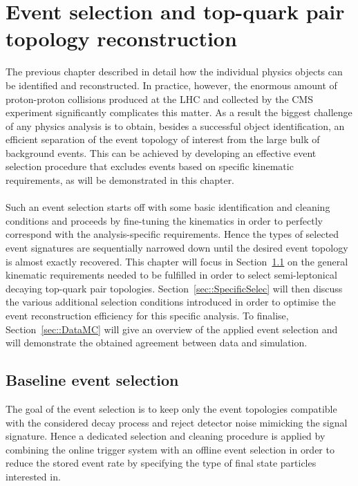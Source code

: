 \chapter{Event selection and top-quark pair topology reconstruction} \label{ch::EvtSel}

The previous chapter described in detail how the individual physics objects can be identified and reconstructed. In practice, however, the enormous amount of proton-proton collisions produced at the LHC and collected by the CMS experiment significantly complicates this matter.
As a result the biggest challenge of any physics analysis is to obtain, besides a successful object identification, an efficient separation of the event topology of interest from the large bulk of background events.
This can be achieved by developing an effective event selection procedure that excludes events based on specific kinematic requirements, as will be demonstrated in this chapter.
\\
\\
Such an event selection starts off with some basic identification and cleaning conditions and proceeds by fine-tuning the kinematics in order to perfectly correspond with the analysis-specific requirements. Hence the types of selected event signatures are sequentially narrowed down until the desired event topology is almost exactly recovered. This chapter will focus in Section~\ref{sec::MainSelec} on the general kinematic requirements needed to be fulfilled in order to select semi-leptonical decaying top-quark pair topologies. Section~\ref{sec::SpecificSelec} will then discuss the various additional selection conditions introduced in order to optimise the event reconstruction efficiency for this specific analysis.
To finalise, Section~\ref{sec::DataMC} will give an overview of the applied event selection and will demonstrate the obtained agreement between data and simulation.

\section{Baseline event selection}\label{sec::MainSelec}
The goal of the event selection is to keep only the event topologies compatible with the considered decay process and reject detector noise mimicking the signal signature. 
Hence a dedicated selection and cleaning procedure is applied by combining the online trigger system with an offline event selection in order to reduce the stored event rate by specifying the type of final state particles interested in.

